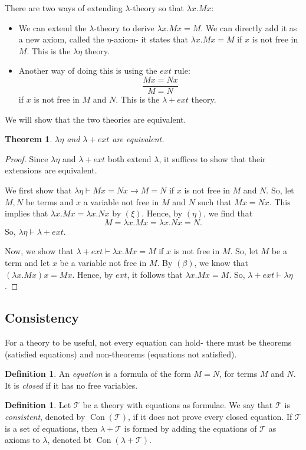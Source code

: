 \documentclass[a4paper, openany]{memoir}
\newtheorem{theorem}[proposition]{Theorem}
\theoremstyle{definition}
\newtheorem{definition}[proposition]{Definition}
\begin{document}
    There are two ways of extending $\lambda$-theory so that $\lambda x.Mx$:
    \begin{itemize}
        \item We can extend the $\lambda$-theory to derive $\lambda x.Mx = M$. We can directly add it as a new axiom, called the $\eta$-axiom- it states that $\lambda x.Mx = M$ if $x$ is not free in $M$. This is the $\lambda \eta$ theory.
        \item Another way of doing this is using the $ext$ rule:
        \[\frac{Mx = Nx}{M = N}\]
        if $x$ is not free in $M$ and $N$. This is the $\lambda + ext$ theory. 
    \end{itemize}
    We will show that the two theories are equivalent.
    \begin{theorem}
        $\lambda \eta$ and $\lambda + ext$ are equivalent.
    \end{theorem}
    \begin{proof}
        Since $\lambda \eta$ and $\lambda + ext$ both extend $\lambda$, it suffices to show that their extensions are equivalent.

        We first show that $\lambda \eta \vdash Mx = Nx \to M = N$ if $x$ is not free in $M$ and $N$. So, let $M, N$ be terms and $x$ a variable not free in $M$ and $N$ such that $Mx = Nx$. This implies that $\lambda x.Mx = \lambda x.Nx$ by $(\xi)$. Hence, by $(\eta)$, we find that
        \[M = \lambda x.Mx = \lambda x.Nx = N.\]
        So, $\lambda \eta \vdash \lambda + ext$.

        Now, we show that $\lambda + ext \vdash \lambda x.Mx = M$ if $x$ is not free in $M$. So, let $M$ be a term and let $x$ be a variable not free in $M$. By $(\beta)$, we know that $(\lambda x.Mx)x = Mx$. Hence, by $ext$, it follows that $\lambda x.Mx = M$. So, $\lambda + ext \vdash \lambda \eta$.
    \end{proof}

    \subsection{Consistency}
    For a theory to be useful, not every equation can hold- there must be theorems (satisfied equations) and non-theorems (equations not satisfied).
    \begin{definition}
        An \emph{equation} is a formula of the form $M = N$, for terms $M$ and $N$. It is \emph{closed} if it has no free variables.
    \end{definition}
    \begin{definition}
        Let $\mathcal{T}$ be a theory with equations as formulae. We say that $\mathcal{T}$ is \emph{consistent}, denoted by $\operatorname{Con}(\mathcal{T})$, if it does not prove every closed equation. If $\mathcal{T}$ is a set of equations, then $\lambda + \mathcal{T}$ is formed by adding the equations of $\mathcal{T}$ as axioms to $\lambda$, denoted bt $\operatorname{Con}(\lambda + \mathcal{T})$. 
    \end{definition}
\end{document}

